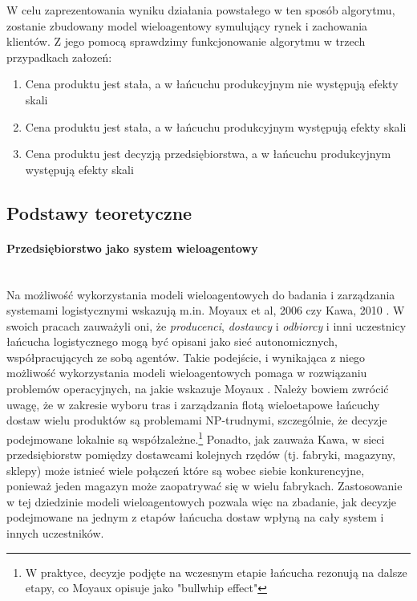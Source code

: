 \documentclass{article}
\begin{document}
W celu zaprezentowania wyniku działania powstałego w ten sposób algorytmu, zostanie zbudowany model wieloagentowy symulujący rynek i zachowania klientów. Z jego pomocą sprawdzimy funkcjonowanie algorytmu w trzech przypadkach załozeń: 

\begin{enumerate} 
	\item Cena produktu jest stała, a w łańcuchu produkcyjnym nie występują efekty skali 
	\item Cena produktu jest stała, a w łańcuchu produkcyjnym występują efekty skali
	\item Cena produktu jest decyzją przedsiębiorstwa, a w łańcuchu produkcyjnym występują efekty skali
\end{enumerate}


\subsection{Podstawy teoretyczne}
\paragraph{Przedsiębiorstwo jako system wieloagentowy} \mbox{}\\
Na możliwość wykorzystania modeli wieloagentowych do badania i zarządzania systemami logistycznymi wskazują m.in. Moyaux et al, 2006 \cite{Moyaux2006}  czy Kawa, 2010 \cite{Kawa2010}. W swoich pracach zauważyli oni, że  \textit{producenci},  \textit{dostawcy} i  \textit{odbiorcy} i inni uczestnicy łańcucha logistycznego mogą być opisani jako sieć autonomicznych, współpracujących ze sobą agentów. Takie podejście, i wynikająca z niego możliwość wykorzystania modeli wieloagentowych pomaga w rozwiązaniu problemów operacyjnych, na jakie wskazuje Moyaux \cite{Moyaux2006}. Należy bowiem zwrócić uwagę, że w zakresie wyboru tras i zarządzania flotą wieloetapowe łańcuchy dostaw wielu produktów są problemami NP-trudnymi, szczególnie, że decyzje podejmowane lokalnie są współzależne.\footnote{W praktyce, decyzje podjęte na wczesnym etapie łańcucha rezonują na dalsze etapy, co Moyaux opisuje jako "bullwhip effect"} Ponadto, jak zauważa Kawa, w sieci przedsiębiorstw pomiędzy dostawcami kolejnych rzędów (tj. fabryki, magazyny, sklepy) może istnieć wiele połączeń które są wobec siebie konkurencyjne, ponieważ jeden magazyn może zaopatrywać się w wielu fabrykach. Zastosowanie w tej dziedzinie modeli wieloagentowych pozwala więc na zbadanie, jak decyzje podejmowane na jednym z etapów łańcucha dostaw wpłyną na cały system i innych uczestników.  
\end{document}
